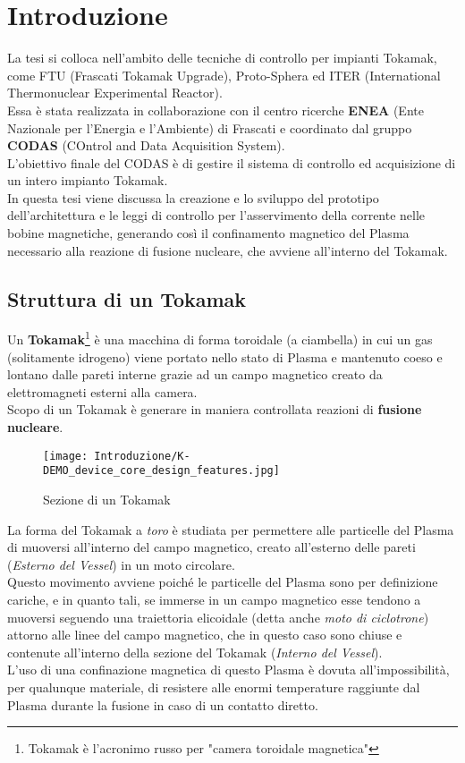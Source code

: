 \chapter*{Introduzione}
La tesi si colloca nell'ambito delle tecniche di controllo per impianti Tokamak, come FTU (Frascati Tokamak Upgrade), Proto-Sphera ed ITER (International Thermonuclear Experimental Reactor).\\
Essa è stata realizzata in collaborazione con il centro ricerche \textbf{ENEA} (Ente Nazionale per l’Energia e l’Ambiente) di Frascati e coordinato dal gruppo \textbf{CODAS} (COntrol and Data Acquisition System).\\
L'obiettivo finale del CODAS è di gestire il sistema di controllo ed acquisizione di un intero impianto Tokamak.\\
In questa tesi viene discussa la creazione e lo sviluppo del prototipo dell'architettura e le leggi di controllo per l'asservimento della corrente nelle bobine magnetiche, generando così il confinamento magnetico del Plasma necessario alla reazione di fusione nucleare, che avviene all'interno del Tokamak.
\newpage

\section*{Struttura di un Tokamak}
Un \textbf{Tokamak}\footnote{Tokamak è l'acronimo russo per "camera toroidale magnetica"} è una macchina di forma toroidale (a ciambella) in cui un gas (solitamente idrogeno) viene portato nello stato di Plasma e mantenuto coeso e lontano dalle pareti interne grazie ad un campo magnetico creato da elettromagneti esterni alla camera.\\
Scopo di un Tokamak è generare in maniera controllata reazioni di \textbf{fusione nucleare}.\\
\begin{figure}[H]
	\centering
	\caption[Sezione di un Tokamak]{Sezione di un Tokamak}
	\texttt{[image: Introduzione/K-DEMO\_device\_core\_design\_features.jpg]}
\end{figure}

\noindent
La forma del Tokamak a \textit{toro} è studiata per permettere alle particelle del Plasma di muoversi all'interno del campo magnetico, creato all'esterno delle pareti (\textit{Esterno del Vessel}) in un moto circolare.\\
Questo movimento avviene poiché le particelle del Plasma sono per definizione cariche, e in quanto tali, se immerse in un campo magnetico esse tendono a muoversi seguendo una traiettoria elicoidale (detta anche \textit{moto di ciclotrone}) attorno alle linee del campo magnetico, che in questo caso sono chiuse e contenute all'interno della sezione del Tokamak (\textit{Interno del Vessel}).\\
L'uso di una confinazione magnetica di questo Plasma è dovuta all'impossibilità, per qualunque materiale, di resistere alle enormi temperature raggiunte dal Plasma durante la fusione in caso di un contatto diretto.\\

